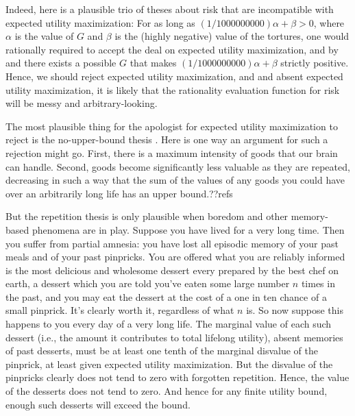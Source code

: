 Indeed, here is a plausible trio of theses about risk that are incompatible with expected utility maximization:
For as long as $(1/1000000000)\alpha + \beta>0$, where $\alpha$ is the value of $G$ and $\beta$ is the (highly negative)
value of the tortures, one would rationally required to accept the deal on expected utility maximization, and by 
and  there exists a possible $G$ that makes $(1/1000000000)\alpha + \beta$ strictly positive.
Hence, we should reject expected utility maximization, and and absent expected utility maximization, it is likely that the rationality evaluation function for risk will be messy
and arbitrary-looking.

The most plausible thing for the apologist for expected utility maximization to reject is the no-upper-bound thesis .
Here is one way an argument for such a rejection might go. First, there is a maximum intensity of goods that our brain can handle.
Second, goods become significantly less valuable as they are repeated, decreasing in such a way that the sum of the values of any 
goods you could have over an arbitrarily long life has an upper bound.??refs

But the repetition thesis is only plausible when boredom and other memory-based phenomena are in play. Suppose you have 
lived for a very long time. Then you suffer from partial amnesia: you have
lost all episodic memory of your past meals and of your past pinpricks. You are offered what you are reliably informed is 
the most delicious and wholesome dessert every prepared by the best chef on earth, a dessert  which you are told you've eaten some large 
number $n$ times in the past, and you may eat the dessert at the cost of a one in ten chance of a small pinprick. It's clearly worth it,
regardless of what $n$ is. So now suppose this happens to you every day of a very long life. The marginal value of each such 
dessert (i.e., the amount it contributes to total lifelong utility), absent memories of past desserts, must  be at least one 
tenth of the marginal disvalue of the pinprick, at least given expected  utility maximization. But the disvalue of the pinpricks 
clearly does not tend to zero with forgotten repetition. Hence, the value of the desserts does not tend to zero. And hence for any
finite utility bound, enough such desserts will exceed the bound.

